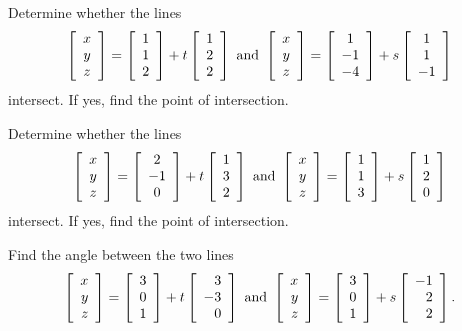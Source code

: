 \documentclass{ximera}
\begin{document}
\begin{exercise}
  Determine whether the lines
  \begin{equation*}
    \startmat{c} x \\ y \\ z \stopmat
    = \startmat{c} 1 \\ 1 \\ 2 \stopmat
    + t \startmat{c} 1 \\ 2 \\ 2 \stopmat
    \quad\mbox{and}\quad
    \startmat{c} x \\ y \\ z \stopmat
    = \startmat{c} 1 \\ -1 \\ -4 \stopmat
    + s \startmat{c} 1 \\ 1 \\ -1 \stopmat
  \end{equation*}
  intersect. If yes, find the point of intersection.
\end{exercise}

\begin{exercise}
  Determine whether the lines
  \begin{equation*}
    \startmat{c} x \\ y \\ z \stopmat
    = \startmat{c} 2 \\ -1 \\ 0 \stopmat
    + t \startmat{c} 1 \\ 3 \\ 2 \stopmat
    \quad\mbox{and}\quad
    \startmat{c} x \\ y \\ z \stopmat
    = \startmat{c} 1 \\ 1 \\ 3 \stopmat
    + s \startmat{c} 1 \\ 2 \\ 0 \stopmat
  \end{equation*}
  intersect. If yes, find the point of intersection.
\end{exercise}

\begin{exercise}
  Find the angle between the two lines
  \begin{equation*}
    \startmat{r} x \\ y \\ z \stopmat
    = \startmat{r} 3 \\ 0 \\ 1 \stopmat
    + t \startmat{r} 3 \\ -3 \\ 0 \stopmat
    \quad\mbox{and}\quad
    \startmat{r} x \\ y \\ z \stopmat
    = \startmat{r} 3 \\ 0 \\ 1 \stopmat
    + s \startmat{r} -1 \\ 2 \\ 2 \stopmat.
  \end{equation*}
\end{exercise}
\end{document}
